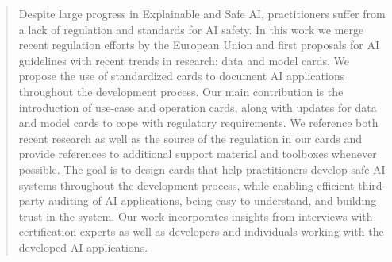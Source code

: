 \documentclass[twoside,11pt]{article}
\begin{document}
\def\thefootnote{*}\def\thefootnote{\arabic{footnote}}

\begin{abstract}
Despite large progress in Explainable and Safe AI, practitioners suffer from a lack of regulation and standards for AI safety. 
In this work we merge recent regulation efforts by the European Union and first proposals for AI guidelines %
with recent trends in research: data and model cards. %
We propose the use of standardized cards to document AI applications throughout the development process. 
Our main contribution is the introduction of use-case and operation cards, along with updates for data and model cards to cope with regulatory requirements.
We reference both recent research as well as the source of the regulation in our cards and provide references to additional support material and toolboxes whenever possible.
The goal is to design cards that help practitioners develop safe AI systems throughout the development process, while enabling efficient third-party auditing of AI applications, being easy to understand, and building trust in the system. Our work incorporates insights from interviews with certification experts as well as developers and individuals working with the developed AI applications.

\end{abstract}







\appendix


\newpage

\end{document}
